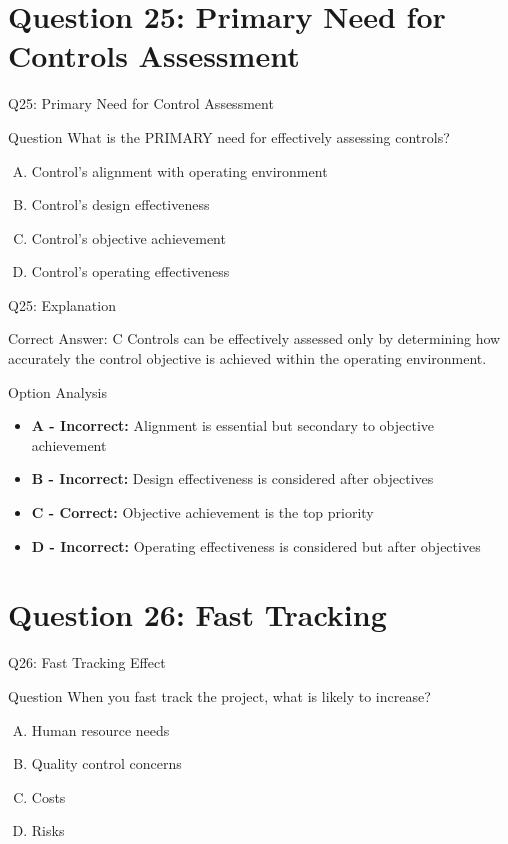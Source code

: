 \documentclass{beamer}
\begin{document}
	\section{Question 25: Primary Need for Controls Assessment}
	
	\begin{frame}{Q25: Primary Need for Control Assessment}
		\begin{block}{Question}
			What is the PRIMARY need for effectively assessing controls?
		\end{block}
		\begin{enumerate}[(A)]
			\item Control's alignment with operating environment
			\item Control's design effectiveness
			\item Control's objective achievement
			\item Control's operating effectiveness
		\end{enumerate}
	\end{frame}
	
	\begin{frame}{Q25: Explanation}
		\begin{block}{Correct Answer: C}
			Controls can be effectively assessed only by determining how accurately the control objective is achieved within the operating environment.
		\end{block}
		\begin{block}{Option Analysis}
			\begin{itemize}
				\item \textbf{A - Incorrect:} Alignment is essential but secondary to objective achievement
				\item \textbf{B - Incorrect:} Design effectiveness is considered after objectives
				\item \textbf{C - Correct:} Objective achievement is the top priority
				\item \textbf{D - Incorrect:} Operating effectiveness is considered but after objectives
			\end{itemize}
		\end{block}
	\end{frame}
	
	\section{Question 26: Fast Tracking}
	
	\begin{frame}{Q26: Fast Tracking Effect}
		\begin{block}{Question}
			When you fast track the project, what is likely to increase?
		\end{block}
		\begin{enumerate}[(A)]
			\item Human resource needs
			\item Quality control concerns
			\item Costs
			\item Risks
		\end{enumerate}
	\end{frame}
	
\end{document}

